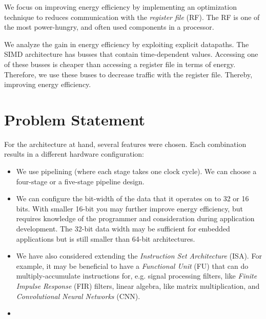 We focus on improving energy efficiency by implementing an optimization technique to reduces communication with the \emph{register file} (RF). The RF is one of the most power-hungry, and often used components in a processor. 

We analyze the gain in energy efficiency by exploiting explicit datapaths. The SIMD architecture has busses that contain time-dependent values. Accessing one of these busses is cheaper than accessing a register file in terms of energy. Therefore, we use these buses to decrease traffic with the register file. Thereby, improving energy efficiency. 


\section{Problem Statement}
For the architecture at hand, several features were chosen. Each combination results in a different hardware configuration:
\begin{itemize}
\item We use pipelining (where each stage takes one clock cycle). We can choose a four-stage or a five-stage pipeline design.
\item	We can configure the bit-width of the data that it operates on to 32 or 16 bits. With smaller 16-bit you may further improve energy efficiency, but requires knowledge of the programmer and consideration during application development. The 32-bit data width may be sufficient for embedded applications but is still smaller than 64-bit architectures.
\item	We have also considered extending the \emph{Instruction Set Architecture} (ISA). For example, it may be beneficial to have a  \emph{Functional Unit} (FU) that can do multiply-accumulate instructions for, e.g. signal processing filters, like \emph{Finite Impulse Response} (FIR) filters, linear algebra, like matrix multiplication, and \emph{Convolutional Neural Networks} (CNN). %
\item 

\end{itemize}

